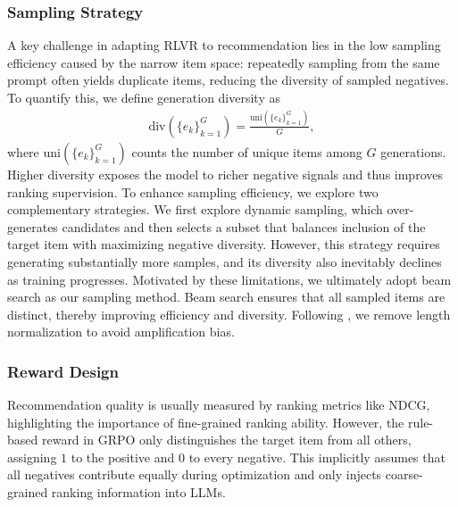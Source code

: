 {\subsubsection{Sampling Strategy}
\label{subsection:sampling}
A key challenge in adapting RLVR to recommendation lies in the low sampling efficiency caused by the narrow item space: repeatedly sampling from the same prompt often yields duplicate items, reducing the diversity of sampled negatives. 
To quantify this, we define generation diversity as
\begin{align}
    \label{eq:diversity}
    \text{div}(\{e_k\}_{k=1}^G)=\frac{\text{uni}(\{e_k\}_{k=1}^G)}{G},
\end{align}
where $\text{uni}(\{e_k\}_{k=1}^G)$ counts the number of unique items among $G$ generations. 
Higher diversity exposes the model to richer negative signals and thus improves ranking supervision.
To enhance sampling efficiency, we explore two complementary strategies.
We first explore dynamic sampling, which over-generates candidates and then selects a subset that balances inclusion of the target item with maximizing negative diversity. 
However, this strategy requires generating substantially more samples, and its diversity also inevitably declines as training progresses. 
Motivated by these limitations, we ultimately adopt beam search as our sampling method. 
Beam search ensures that all sampled items are distinct, thereby improving efficiency and diversity. 
Following \citep{Decodingmatters}, we remove length normalization to avoid amplification bias.


\subsubsection{Reward Design}
\label{method:reward}
Recommendation quality is usually measured by ranking metrics like NDCG, highlighting the importance of fine-grained ranking ability. 
However, the rule-based reward in GRPO only distinguishes the target item from all others, assigning $1$ to the positive and $0$ to every negative.
This implicitly assumes that all negatives contribute equally during optimization and only injects coarse-grained ranking information into LLMs.

}
